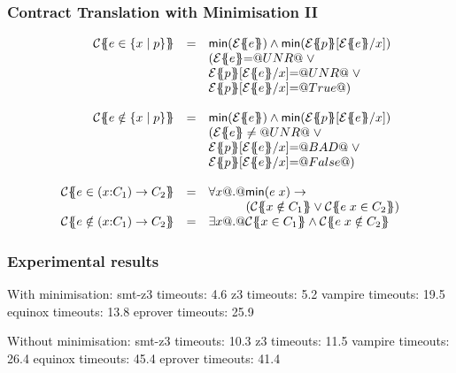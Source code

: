 \documentclass[serif,professionalfont]{beamer}
\begin{document}
\begin{frame}[fragile]
  \frametitle{Contract Translation with Minimisation II}

  \[\begin{array}{rcl}
  \trc{e \in \{x \mid p \}}
    & = &      \Min(\etrans{}{}{e}) \land \Min(\etrans{}{}{p}[\etrans{}{}{e}/x]) \\
    &   &      (\etrans{}{}{e} {=} \unr \; \lor \; \\
    &   &      \etrans{}{}{p}[\etrans{}{}{e}/x] {=} \unr \; \lor \; \\
    &   &      \etrans{}{}{p}[\etrans{}{}{e}/x] {=} \True)
  \\ \\
  \trc{e \notin \{x \mid p \}}
    & = &      \Min(\etrans{}{}{e}) \land \Min(\etrans{}{}{p}[\etrans{}{}{e}/x]) \\
    &   &      (\etrans{}{}{e} \neq \unr \; \lor \; \\
    &   &      \etrans{}{}{p}[\etrans{}{}{e}/x] {=} \bad \; \lor \; \\
    &   &      \etrans{}{}{p}[\etrans{}{}{e}/x] {=} \False)
  \\ \\
  \trc{e \in (x{:}C_1) \to C_2}
    & = & \forall x @.@  \Min(e\;x) \to \\
    &   & \qquad\quad (\trc{x \notin C_1} \lor \trc{e\;x \in C_2}) \\
  \trc{e \notin (x{:}C_1) \to C_2}
    & = & \exists x @.@  \trc{x \in C_1} \land \trc{e\;x \notin C_2}
  \end{array}\]

\end{frame}

\begin{frame}[fragile]
  \frametitle{Experimental results}

    \begin{code}
    With minimisation:
    smt-z3     timeouts:  4.6%
    z3         timeouts:  5.2%
    vampire    timeouts: 19.5%
    equinox    timeouts: 13.8%
    eprover    timeouts: 25.9%

    Without minimisation:
    smt-z3     timeouts: 10.3%
    z3         timeouts: 11.5%
    vampire    timeouts: 26.4%
    equinox    timeouts: 45.4%
    eprover    timeouts: 41.4%
    \end{code}

\end{frame}
\end{document}
